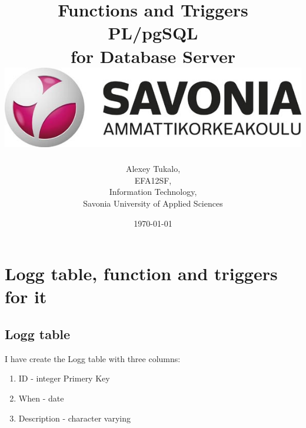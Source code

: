 \documentclass[english]{article}
\date{}
\begin{document}
\title{\vspace{2in}Functions and Triggers\\ PL/pgSQL\\
\small for Database Server\\
\vspace{0.5in}\includegraphics{savonia.jpg}}

\nopagebreak
\maketitle


\vspace{3in}

\author{
\begin{flushright}
Alexey Tukalo,\\
EFA12SF,\\
Information Technology,\\
Savonia University of Applied Sciences
\end{flushright}
}

\date{\today}
\thispagestyle{empty}

\newpage
\setcounter{page}{1}
\setcounter{tocdepth}{2}
\tableofcontents

\newpage


\section{Logg table, function and triggers for it}
\subsection{Logg table}
I have create the Logg table with three columns:

\begin{enumerate}
\item ID - integer Primery Key
\item When - date
\item Description - character varying 
\end{enumerate}
\end{document}
